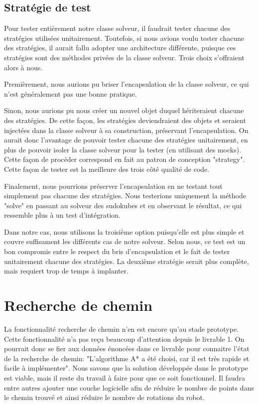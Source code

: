 \subsection{Stratégie de test}
Pour tester entièrement notre classe solveur, il faudrait tester chacune des stratégies utilisées unitairement. Toutefois, si nous avions voulu tester chacune des stratégies, il aurait fallu adopter une architecture différente, puisque ces stratégies sont des méthodes privées de la classe solveur. Trois choix s'offraient alors à nous.

Premièrement, nous aurions pu briser l'encapsulation de la classe solveur, ce qui n'est généralement pas une bonne pratique.

Sinon, nous aurions pu nous créer un nouvel objet duquel hériteraient chacune des stratégies. De cette façon, les stratégies deviendraient des objets et seraient injectées dans la classe solveur à sa construction, préservant l'encapsulation. On aurait donc l'avantage de pouvoir tester chacune des stratégies unitairement, en plus de pouvoir isoler la classe solveur pour la tester (en utilisant des mocks). Cette façon de procéder correspond en fait au patron de conception "strategy". Cette façon de tester est la meilleure des trois côté qualité de code.

Finalement, nous pourrions préserver l'encapsulation en ne testant tout simplement pas chacune des stratégies. Nous testerions uniquement la méthode "solve" en passant au solveur des sudokubes et en observant le résultat, ce qui ressemble plus à un test d'intégration.

Dans notre cas, nous utilisons la troisième option puisqu'elle est plus simple et couvre suffisament les différents cas de notre solveur. Selon nous, ce test est un bon compromis entre le respect du bris d'encapsulation et le fait de tester unitairement chacune des stratégies. La deuxième stratégie serait plus complète, mais requiert trop de temps à implanter.

\section{Recherche de chemin}
La fonctionnalité recherche de chemin n’en est encore qu’au stade prototype. Cette fonctionnalité n'a pas reçu beaucoup d'attention depuis le livrable 1. On pourrait donc se fier aux données énoncées dans ce livrable pour connaitre l'état de la recherche de chemin: "L'algorithme A* a été choisi, car il est très rapide et facile à implémenter". Nous savons que la solution développée dans le prototype est viable, mais il reste du travail à faire pour que ce soit fonctionnel. Il faudra entre autres ajouter une couche logicielle afin de réduire le nombre de points dans le chemin trouvé et ainsi réduire le nombre de rotations du robot.

